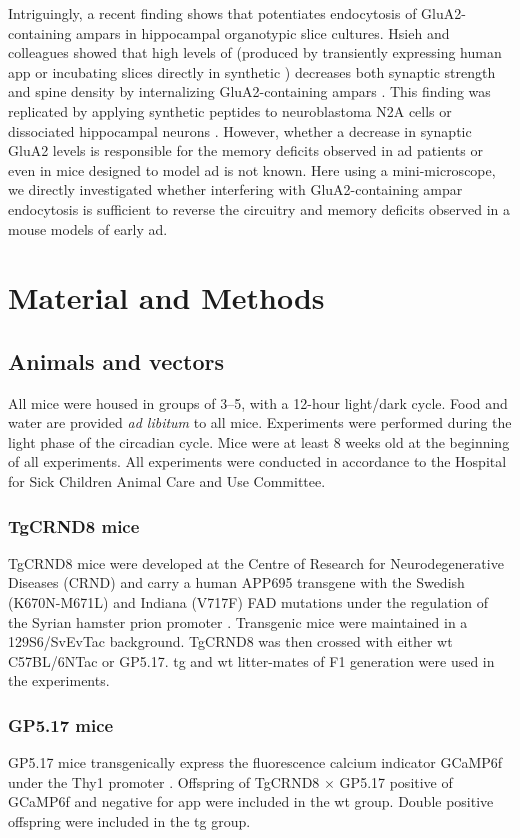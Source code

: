 Intriguingly, a recent finding shows that \abeta{} potentiates endocytosis of GluA2-containing \glspl{ampar} in hippocampal organotypic slice cultures.  Hsieh and colleagues showed that high levels of \abeta{} (produced by transiently expressing human \gls{app} or incubating slices directly in synthetic \abeta) decreases both synaptic strength and spine density by internalizing GluA2-containing \glspl{ampar} \citep{hsieh06}. This finding was replicated by applying synthetic \abeta{} peptides to neuroblastoma N2A cells \citep{zhao10} or dissociated hippocampal neurons \citep{liu10, zhao10}. However, whether a decrease in synaptic GluA2 levels is responsible for the memory deficits observed in \gls{ad} patients or even in mice designed to model \gls{ad} is not known. Here using a mini-microscope, we directly investigated whether interfering with GluA2-containing \gls{ampar} endocytosis is sufficient to reverse the circuitry and memory deficits observed in a mouse models of early \gls{ad}.
\section{Material and Methods}

\subsection{Animals and vectors}
All mice were housed in groups of 3--5, with a 12-hour light/dark cycle. Food and water are provided \textit{ad libitum} to all mice. Experiments were performed during the light phase of the circadian cycle. Mice were at least 8 weeks old at the beginning of all experiments. All experiments were conducted in accordance to the Hospital for Sick Children Animal Care and Use Committee.

\subsubsection{TgCRND8 mice}
TgCRND8 mice were developed at the Centre of Research for Neurodegenerative Diseases (CRND) and carry a human APP695 transgene with the Swedish (K670N-M671L) and Indiana (V717F) FAD mutations under the regulation of the Syrian hamster prion promoter \citep{chishti01}. Transgenic mice were maintained in a 129S6/SvEvTac background. TgCRND8 was then crossed with either \gls{wt} C57BL/6NTac or GP5.17. \Gls{tg} and \gls{wt} litter-mates of F1 generation were used in the experiments.


\subsubsection{GP5.17 mice}
GP5.17 mice transgenically express the fluorescence calcium indicator GCaMP6f under the Thy1 promoter \citep{dana14}. Offspring of TgCRND8 $\times$ GP5.17 positive of GCaMP6f and negative for \gls{app} were included in the \gls{wt} group. Double positive offspring were included in the \gls{tg} group.


